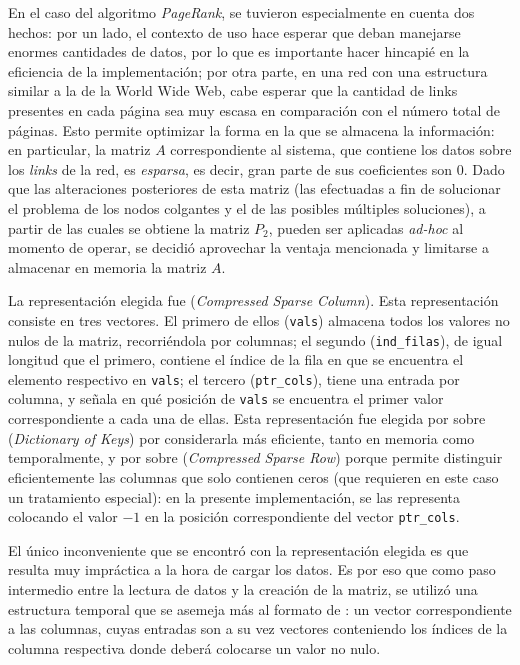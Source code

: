         En el caso del algoritmo \emph{PageRank}, se tuvieron especialmente en cuenta dos hechos: por un lado, el contexto de uso hace esperar que deban manejarse enormes cantidades de datos, por lo que es importante hacer hincapié en la eficiencia de la implementación; por otra parte, en una red con una estructura similar a la de la World Wide Web, cabe esperar que la cantidad de links presentes en cada página sea muy escasa en comparación con el número total de páginas. Esto permite optimizar la forma en la que se almacena la información: en particular, la matriz $A$ correspondiente al sistema, que contiene los datos sobre los \emph{links} de la red, es \emph{esparsa}, es decir, gran parte de sus coeficientes son $0$. Dado que las alteraciones posteriores de esta matriz (las efectuadas a fin de solucionar el problema de los nodos colgantes y el de las posibles múltiples soluciones), a partir de las cuales se obtiene la matriz $P_2$, pueden ser aplicadas \emph{ad-hoc} al momento de operar, se decidió aprovechar la ventaja mencionada y limitarse a almacenar en memoria la matriz $A$.

        La representación elegida fue  (\emph{Compressed Sparse Column}). Esta representación consiste en tres vectores. El primero de ellos (\texttt{vals}) almacena todos los valores no nulos de la matriz, recorriéndola por columnas; el segundo (\texttt{ind\_filas}), de igual longitud que el primero, contiene el índice de la fila en que se encuentra el elemento respectivo en \texttt{vals}; el tercero (\texttt{ptr\_cols}), tiene una entrada por columna, y señala en qué posición de \texttt{vals} se encuentra el primer valor correspondiente a cada una de ellas. Esta representación fue elegida por sobre  (\emph{Dictionary of Keys}) por considerarla más eficiente, tanto en memoria como temporalmente, y por sobre  (\emph{Compressed Sparse Row}) porque permite distinguir eficientemente las columnas que solo contienen ceros (que requieren en este caso un tratamiento especial): en la presente implementación, se las representa colocando el valor $-1$ en la posición correspondiente del vector \texttt{ptr\_cols}.

        El único inconveniente que se encontró con la representación elegida es que resulta muy impráctica a la hora de cargar los datos. Es por eso que como paso intermedio entre la lectura de datos y la creación de la matriz, se utilizó una estructura temporal que se asemeja más al formato de : un vector correspondiente a las columnas, cuyas entradas son a su vez vectores conteniendo los índices de la columna respectiva donde deberá colocarse un valor no nulo.


